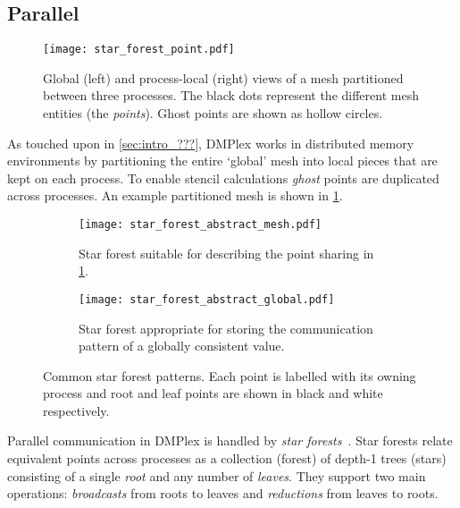 \documentclass[thesis]{subfiles}
\begin{document}
\subsection{Parallel}
\label{sec:dmplex_parallel}

\begin{figure}
  \centering
  \texttt{[image: star\_forest\_point.pdf]}
  \caption{
    Global (left) and process-local (right) views of a mesh partitioned between three processes.
    The black dots represent the different mesh entities (the \emph{points}).
    Ghost points are shown as hollow circles.
  }
  \label{fig:dmplex_split_mesh}
\end{figure}

As touched upon in \cref{sec:intro_???}, DMPlex works in distributed memory environments by partitioning the entire `global' mesh into local pieces that are kept on each process.
To enable stencil calculations \emph{ghost} points are duplicated across processes.
An example partitioned mesh is shown in \cref{fig:dmplex_split_mesh}.

\begin{figure}
  \centering
  \begin{subfigure}[t]{.45\textwidth}
    \centering
    \texttt{[image: star\_forest\_abstract\_mesh.pdf]}
    \caption{Star forest suitable for describing the point sharing in \cref{fig:dmplex_split_mesh}.}
    \label{fig:star_forest_abstract_mesh}
  \end{subfigure}
  \hspace{1em}
  \begin{subfigure}[t]{.45\textwidth}
    \centering
    \texttt{[image: star\_forest\_abstract\_global.pdf]}
    \caption{Star forest appropriate for storing the communication pattern of a globally consistent value.}
    \label{fig:star_forest_abstract_global}
  \end{subfigure}
  \caption{
    Common star forest patterns.
    Each point is labelled with its owning process and root and leaf points are shown in black and white respectively.
  }
\end{figure}

Parallel communication in DMPlex is handled by \textit{star forests}~\cite{zhangPetscSFScalableCommunication2021}.
Star forests relate equivalent points across processes as a collection (forest) of depth-1 trees (stars) consisting of a single \emph{root} and any number of \emph{leaves}.
They support two main operations: \emph{broadcasts} from roots to leaves and \emph{reductions} from leaves to roots.
\end{document}
